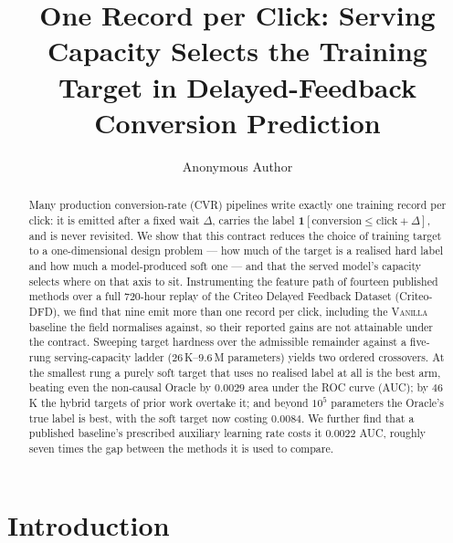 \documentclass[runningheads]{llncs}
\newcommand{\ind}{\mathbf{1}}
\begin{document}
\title{One Record per Click: Serving Capacity Selects the Training Target in Delayed-Feedback Conversion Prediction}

\author{Anonymous Author}

\maketitle

\begin{abstract}
Many production conversion-rate (CVR) pipelines write exactly one training record per click: it is
emitted after a fixed wait $\Delta$, carries the label
$\ind[\text{conversion} \le \text{click}+\Delta]$, and is never revisited. We show that this
contract reduces the choice of training target to a one-dimensional design problem --- how much of
the target is a realised hard label and how much a model-produced soft one --- and that the served
model's capacity selects where on that axis to sit. Instrumenting the feature path of fourteen
published methods over a full 720-hour replay of the Criteo Delayed Feedback Dataset (Criteo-DFD),
we find that nine emit more than one record per click, including the \textsc{Vanilla} baseline the
field normalises against, so their reported gains are not attainable under the contract. Sweeping
target hardness over the admissible remainder against a five-rung serving-capacity ladder
($26$\,K--$9.6$\,M parameters) yields two ordered crossovers. At the smallest rung a purely soft
target that uses no realised label at all is the best arm, beating even the non-causal Oracle by
$0.0029$ area under the ROC curve (AUC); by $46$\,K the hybrid targets of prior work overtake it;
and beyond $10^{5}$ parameters the Oracle's true label is best, with the soft target now costing
$0.0084$. We further find that a published baseline's prescribed auxiliary
learning rate costs it $0.0022$ AUC, roughly seven times the gap between the methods it is used to
compare.
\end{abstract}

\section{Introduction}
\end{document}
